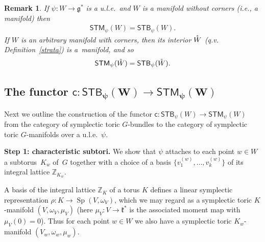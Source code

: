 \documentclass[10pt,a4paper]{amsart}
\numberwithin{equation}{section}
\newtheorem{Remark}[Lemma]{Remark}
\begin{document}
\begin{Remark}\label{interior}
  If $\psi \colon W\to {\mathfrak g}^*$ is a u.l.e.\ and $W$
is a manifold without corners (i.e., a manifold) then
\begin{gather*}
{\textsf{STM}}_\psi(W) = {\textsf{STB}}_\psi (W).
\end{gather*}
If $W$ is an arbitrary manifold with corners, then its interior ${\mathaccent23{W}}$
(q.v. Def\/inition~\ref{strata}) is a~manifold, and so
\begin{gather*}
{\textsf{STM}}_\psi({\mathaccent23{W}}) = {\textsf{STB}}_\psi ({\mathaccent23{W}}).
\end{gather*}
\end{Remark}


\subsection*{The functor $\boldsymbol{{\textsf{c}} \colon{\textsf{STB}}_{\psi}(W)  \to   {\textsf{STM}}_{\psi}(W)}$}

Next we outline the construction of the functor ${\textsf{c}} \colon
  {\textsf{STB}}_{\psi}(W)   \to   {\textsf{STM}}_{\psi}(W) $ from the category of
symplectic toric $G$-bundles to the category of symplectic toric
$G$-manifolds over a u.l.e.~$\psi$.

{\bf Step 1: characteristic subtori.} We show that $\psi$
attaches to each point $w\in W$ a subto\-rus~$K_w$ of~$G$ together with
a choice of a basis
$\{v_1^{(w)},\ldots, v_k^{(w)}\}$ of its integral lattice ${\mathbb Z}_{K_w}$.

A basis of the integral lattice ${\mathbb Z}_K$ of a torus $K$
def\/ines a linear symplectic representation
$\rho\colon K\to \operatorname{Sp}(V,\omega_V)$, which we may regard as a symplectic toric
$K$-manifold $(V,\omega_V, \mu_V)$ (here $\mu_V\colon V\to{\mathfrak k}^*$ is the
associated moment map with $\mu_V(0)=0$).  Thus for each point
$w\in W$ we also have a symplectic toric $K_w$-manifold $(V_w,
\omega_w, \mu_w)$.
\end{document}
